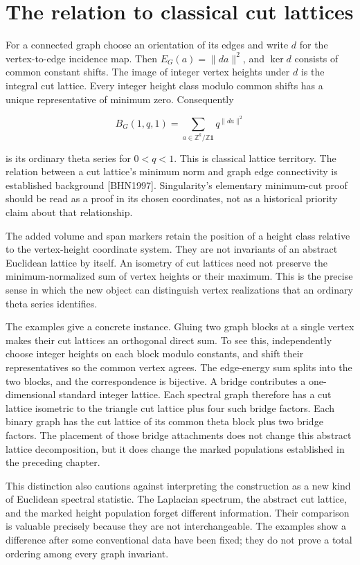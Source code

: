 \documentclass[
  11pt,
  a4paper,
]{report}
\begin{document}
\hypertarget{the-relation-to-classical-cut-lattices}{%
\section{The relation to classical cut
lattices}\label{the-relation-to-classical-cut-lattices}}

For a connected graph choose an orientation of its edges and write \(d\)
for the vertex-to-edge incidence map. Then \(E_G(a)=\|da\|^2\), and
\(\ker d\) consists of common constant shifts. The image of integer
vertex heights under \(d\) is the integral cut lattice. Every integer
height class modulo common shifts has a unique representative of minimum
zero. Consequently

\[
B_G(1,q,1)=\sum_{a\in\mathbb Z^k/\mathbb Z\mathbf1}q^{\|da\|^2}
\]

is its ordinary theta series for \(0<q<1\). This is classical lattice
territory. The relation between a cut lattice's minimum norm and graph
edge connectivity is established background {[}BHN1997{]}. Singularity's
elementary minimum-cut proof should be read as a proof in its chosen
coordinates, not as a historical priority claim about that relationship.

The added volume and span markers retain the position of a height class
relative to the vertex-height coordinate system. They are not invariants
of an abstract Euclidean lattice by itself. An isometry of cut lattices
need not preserve the minimum-normalized sum of vertex heights or their
maximum. This is the precise sense in which the new object can
distinguish vertex realizations that an ordinary theta series
identifies.

The examples give a concrete instance. Gluing two graph blocks at a
single vertex makes their cut lattices an orthogonal direct sum. To see
this, independently choose integer heights on each block modulo
constants, and shift their representatives so the common vertex agrees.
The edge-energy sum splits into the two blocks, and the correspondence
is bijective. A bridge contributes a one-dimensional standard integer
lattice. Each spectral graph therefore has a cut lattice isometric to
the triangle cut lattice plus four such bridge factors. Each binary
graph has the cut lattice of its common theta block plus two bridge
factors. The placement of those bridge attachments does not change this
abstract lattice decomposition, but it does change the marked
populations established in the preceding chapter.

This distinction also cautions against interpreting the construction as
a new kind of Euclidean spectral statistic. The Laplacian spectrum, the
abstract cut lattice, and the marked height population forget different
information. Their comparison is valuable precisely because they are not
interchangeable. The examples show a difference after some conventional
data have been fixed; they do not prove a total ordering among every
graph invariant.
\end{document}

